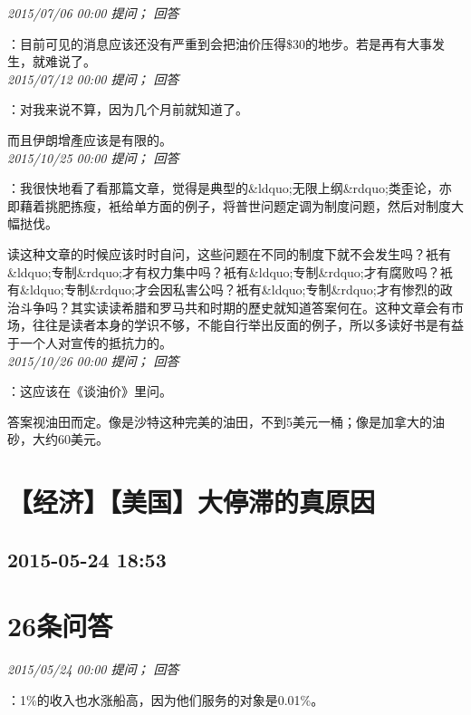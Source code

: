 \documentclass[twocolumn]{ctexart}
\begin{document}
\textit{\hfill\noindent\small 2015/07/06 00:00 提问； 回答}

：目前可见的消息应该还没有严重到会把油价压得\$30的地步。若是再有大事发生，就难说了。\\

\textit{\hfill\noindent\small 2015/07/12 00:00 提问； 回答}

：对我来说不算，因为几个月前就知道了。

而且伊朗增產应该是有限的。\\

\textit{\hfill\noindent\small 2015/10/25 00:00 提问； 回答}

：我很快地看了看那篇文章，觉得是典型的\&ldquo;无限上纲\&rdquo;类歪论，亦即藉着挑肥拣瘦，衹给单方面的例子，将普世问题定调为制度问题，然后对制度大幅挞伐。

读这种文章的时候应该时时自问，这些问题在不同的制度下就不会发生吗？衹有\&ldquo;专制\&rdquo;才有权力集中吗？衹有\&ldquo;专制\&rdquo;才有腐败吗？衹有\&ldquo;专制\&rdquo;才会因私害公吗？衹有\&ldquo;专制\&rdquo;才有惨烈的政治斗争吗？其实读读希腊和罗马共和时期的歷史就知道答案何在。这种文章会有市场，往往是读者本身的学识不够，不能自行举出反面的例子，所以多读好书是有益于一个人对宣传的抵抗力的。\\

\textit{\hfill\noindent\small 2015/10/26 00:00 提问； 回答}

：这应该在《谈油价》里问。

答案视油田而定。像是沙特这种完美的油田，不到5美元一桶；像是加拿大的油砂，大约60美元。\\


\section{【经济】【美国】大停滞的真原因}
\subsection{2015-05-24 18:53}


\section{26条问答}

\textit{\hfill\noindent\small 2015/05/24 00:00 提问； 回答}

：1\%的收入也水涨船高，因为他们服务的对象是0.01\%。\\
\end{document}
